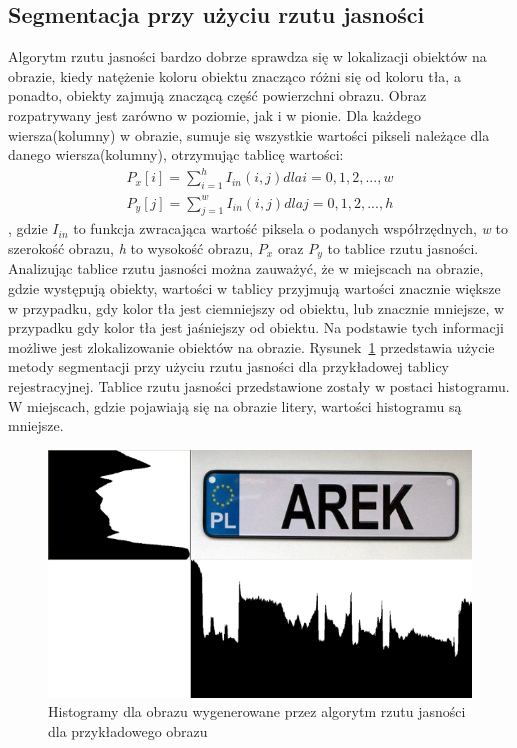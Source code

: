 \subsection{Segmentacja przy użyciu rzutu jasności} 
Algorytm rzutu jasności bardzo dobrze sprawdza się w lokalizacji obiektów na obrazie, kiedy natężenie koloru obiektu znacząco różni się od koloru tła, a ponadto, obiekty zajmują znaczącą część powierzchni obrazu. Obraz rozpatrywany jest zarówno w poziomie, jak i w pionie. Dla każdego wiersza(kolumny) w obrazie, sumuje się wszystkie wartości pikseli należące dla danego wiersza(kolumny), otrzymując tablicę wartości:
\begin{gather*}
  P_x[i] = \sum\limits_{i=1}^h I_{in}(i, j) dla i = 0,1,2,...,w \\
  P_y[j] = \sum\limits_{j=1}^w I_{in}(i, j) dla j = 0,1,2,...,h
\end{gather*}, gdzie $I_{in}$ to funkcja zwracająca wartość piksela o podanych współrzędnych, \textit{w} to szerokość obrazu, \textit{h} to wysokość obrazu, $P_x$ oraz $P_y$ to tablice rzutu jasności. Analizując tablice rzutu jasności można zauważyć, że w miejscach na obrazie, gdzie występują obiekty, wartości w tablicy przyjmują wartości znacznie większe w przypadku, gdy kolor tła jest ciemniejszy od obiektu, lub znacznie mniejsze, w przypadku gdy kolor tła jest jaśniejszy od obiektu. Na podstawie tych informacji możliwe jest zlokalizowanie obiektów na obrazie. Rysunek~\ref{fig:rzut_jasnosci} przedstawia użycie metody segmentacji przy użyciu rzutu jasności dla przykładowej tablicy rejestracyjnej. Tablice rzutu jasności przedstawione zostały w postaci histogramu. W miejscach, gdzie pojawiają się na obrazie litery, wartości histogramu są mniejsze.

\begin{figure}
  \centering
  \includegraphics[width=15cm]{img/rzut-jasnosci}
  \caption{Histogramy dla obrazu wygenerowane przez algorytm rzutu jasności dla przykładowego obrazu}
  \label{fig:rzut_jasnosci}
\end{figure}
